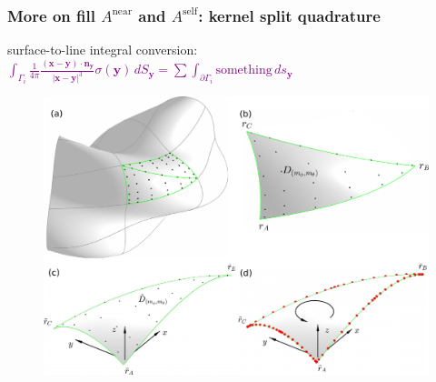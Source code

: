 \documentclass[t]{beamer}
\newcommand{\ft}[1]{\frametitle{#1}}
\newcommand{\mbf}[1]{{\bm #1}}           %
\newcommand{\com}[1]{{\scriptsize \textcolor{purple}{#1}}}      %
\newcommand{\xx}{\mbf{x}}
\newcommand{\yy}{\mbf{y}}
\newcommand{\nn}{\mbf{n}}
\begin{document}
\begin{frame}\ft{More on fill $A^{\text{near}}$ and $A^{\text{self}}$: \small{kernel split quadrature}}

surface-to-line integral conversion: \com{$\int_{\Gamma_i} \frac{1}{4\pi}\frac{(\xx-\yy)\cdot \nn_{\yy}}{|\xx-\yy|^3}\sigma(\yy)\, dS_{\yy} = \sum \int_{\partial \Gamma_i} \text{something}\, ds_\yy$}
\begin{figure}
    \centering
    \includegraphics[height = 0.5\textwidth]{scheme.pdf}
\end{figure}

\end{frame}
\end{document}
